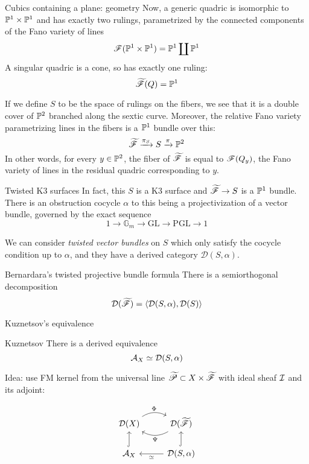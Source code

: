 \documentclass[10pt]{beamer}
\begin{document}
\begin{frame}{Cubics containing a plane: geometry}
Now, a generic quadric is isomorphic to $\P^1 \times \P^1$ and has exactly two rulings, parametrized by the connected components of the Fano variety of lines $$\scrF(\P^1 \times \P^1)=\P^1 \coprod \P^1$$
\pause A singular quadric is a cone, so has exactly one ruling: $$\tscrF(Q)=\P^1$$ \pause

If we define $S$ to be the space of rulings on the fibers, we see that it is a double cover of $\P^2$ branched along the sextic curve. Moreover, the relative Fano variety parametrizing lines in the fibers is a $\P^1$ bundle over this: $$\tscrF \xrightarrow{\pi_S} S \xrightarrow{\pi} \P^2$$
\pause In other words, for every $y\in \P^2$, the fiber of $\tscrF$ is equal to $\scrF(Q_y)$, the Fano variety of lines in the residual quadric corresponding to $y$.
\end{frame}

\begin{frame}{Twisted K3 surfaces}
    In fact, this $S$ is a K3 surface and $\tscrF \rightarrow S$ is a $\P^1$ bundle. \pause There is an obstruction cocycle $\alpha$ to this being a projectivization of a vector bundle, governed by the exact sequence $$1\rightarrow \mathbb{G}_m\rightarrow \mathrm{GL}\rightarrow \mathrm{PGL}\rightarrow 1$$ \pause

    We can consider \emph{twisted vector bundles} on $S$ which only satisfy the cocycle condition up to $\alpha$, and they have a derived category $\mathcal{D}(S,\alpha)$. 

    \begin{colorthm}{Bernardara's twisted projective bundle formula}{}
        There is a semiorthogonal decomposition $$\calD (\tscrF)=\langle \calD(S,\alpha), \calD(S)\rangle $$
    \end{colorthm}
\end{frame}

\begin{frame}[fragile]{Kuznetsov's equivalence}
    \begin{colorthm}{Kuznetsov}{}
        There is a derived equivalence $$\calA_X\simeq \calD(S,\alpha)$$
    \end{colorthm}
    \pause
    Idea: use FM kernel from the universal line $\tscrP\subset X \times \tscrF$ with ideal sheaf $\calI$ and its adjoint: 

      \[\begin{tikzcd}
        \calD(X) \arrow[r, "\Phi", bend left] & \calD(\tscrF) \arrow[l, "\Psi", bend left]            \\
        \calA_X \arrow[u, hook]               & {\calD(S,\alpha)} \arrow[u, hook] \arrow[l, "\simeq"]
        \end{tikzcd}\]

    
\end{frame}











    
\end{document}
